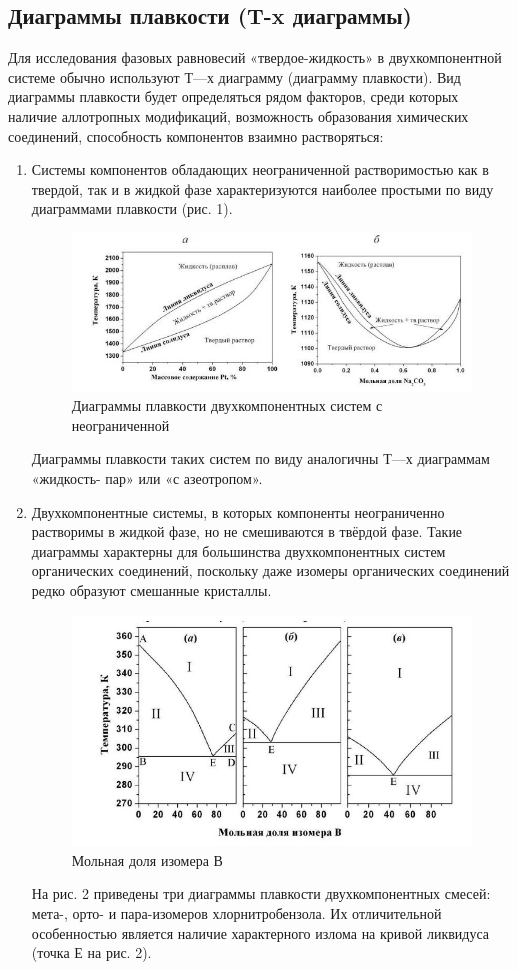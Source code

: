 \documentclass[a4paper,12pt]{article} %
\begin{document}
\subsection{Диаграммы плавкости (T-x диаграммы)}
Для исследования фазовых равновесий «твердое-жидкость» в двухкомпонентной системе обычно используют Т—х диаграмму (диаграмму 
плавкости). Вид диаграммы плавкости будет определяться рядом факторов, 
среди которых наличие аллотропных модификаций, возможность 
образования химических соединений, способность компонентов взаимно 
растворяться: 
\begin{enumerate}
    \item Системы компонентов обладающих неограниченной растворимостью как 
в твердой, так и в жидкой фазе характеризуются наиболее простыми по 
виду диаграммами плавкости (рис. 1). 
\newpage
\begin{figure}[H]
    \centering
    \includegraphics[width = 180 mm]{gr_3.jpg}
    \caption{Диаграммы плавкости двухкомпонентных систем с неограниченной}
\end{figure}
Диаграммы плавкости таких систем по виду аналогичны Т—х диаграммам 
«жидкость- пар» или «с азеотропом». 
\item Двухкомпонентные 
системы, в которых компоненты неограниченно растворимы в жидкой 
фазе, но не смешиваются в твёрдой фазе. Такие диаграммы характерны 
для большинства двухкомпонентных систем органических соединений, 
поскольку даже изомеры органических соединений редко образуют 
смешанные кристаллы. 
\begin{figure}[H]
    \centering
    \includegraphics[width = 180 mm]{gr_2.jpg}
    \caption{Мольная доля изомера $В$}
\end{figure}
На рис. 2 приведены три диаграммы плавкости двухкомпонентных смесей: мета-, орто- и пара-изомеров хлорнитробензола. Их отличительной 
особенностью является наличие характерного излома на кривой ликвидуса 
(точка Е на рис. 2). 

\end{enumerate}
\end{document}
